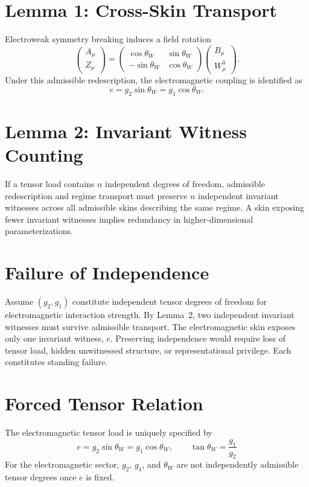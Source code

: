 ﻿\documentclass[11pt]{article}
\begin{document}
\section{Lemma 1: Cross-Skin Transport}
Electroweak symmetry breaking induces a field rotation
\begin{equation}
\begin{pmatrix}
A_\mu \\
Z_\mu
\end{pmatrix}
=
\begin{pmatrix}
\cos\theta_W & \sin\theta_W \\
-\sin\theta_W & \cos\theta_W
\end{pmatrix}
\begin{pmatrix}
B_\mu \\
W^3_\mu
\end{pmatrix}.
\end{equation}
Under this admissible redescription, the electromagnetic coupling is identified as
\begin{equation}
e = g_2 \sin\theta_W = g_1 \cos\theta_W .
\end{equation}

\section{Lemma 2: Invariant Witness Counting}
If a tensor load contains $n$ independent degrees of freedom, admissible redescription and regime transport must preserve $n$ independent invariant witnesses across all admissible skins describing the same regime. A skin exposing fewer invariant witnesses implies redundancy in higher-dimensional parameterizations.

\section{Failure of Independence}
Assume $(g_2, g_1)$ constitute independent tensor degrees of freedom for electromagnetic interaction strength. By Lemma~2, two independent invariant witnesses must survive admissible transport. The electromagnetic skin exposes only one invariant witness, $e$. Preserving independence would require loss of tensor load, hidden unwitnessed structure, or representational privilege. Each constitutes standing failure.

\section{Forced Tensor Relation}
The electromagnetic tensor load is uniquely specified by
\begin{equation}
\boxed{\;e = g_2 \sin\theta_W = g_1 \cos\theta_W,\qquad \tan\theta_W = \frac{g_1}{g_2}\;}
\end{equation}
For the electromagnetic sector, $g_2$, $g_1$, and $\theta_W$ are not independently admissible tensor degrees once $e$ is fixed.
\end{document}
